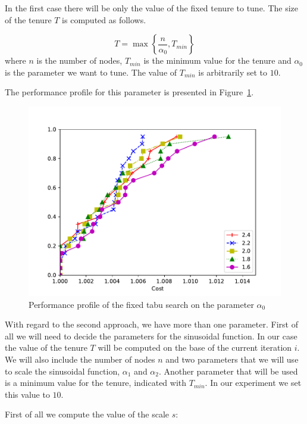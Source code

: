 \documentclass{article}
\begin{document}
In the first case there will be only the value of the fixed tenure to tune.
The size of the tenure $T$ is computed as follows.

\begin{equation*}
        T = \max \left\{
                \frac{n}{\alpha_0} ,
                T_{min}
        \right\}
\end{equation*}
where $n$ is the number of nodes, $T_{min}$ is the minimum value for the tenure
and $\alpha_0$ is the parameter we want to tune. The value of $T_{min}$ is arbitrarily
set to $10$.

The performance profile for this parameter is presented in Figure~\ref{fig:ht_fixten}.

\begin{figure}[ht]
        \caption{Performance profile of the fixed tabu search on the parameter $\alpha_0$}
        \label{fig:ht_fixten}
        \centering
        \includegraphics[width=340pt]{assets/ht_fixten.pdf}
\end{figure}

\clearpage

With regard to the second approach, we have more than one parameter. First of
all we will need to decide the parameters for the sinusoidal function. In our
case the value of the tenure $T$ will be computed on the base of the current
iteration $i$. We will also include the number of nodes $n$ and two parameters
that we will use to scale the sinusoidal function, $\alpha_1$ and $\alpha_2$.
Another parameter that will be used is a minimum value for the tenure,
indicated with $T_{min}$. In our experiment we set this value to $10$.

First of all we compute the value of the scale $s$:
\end{document}
